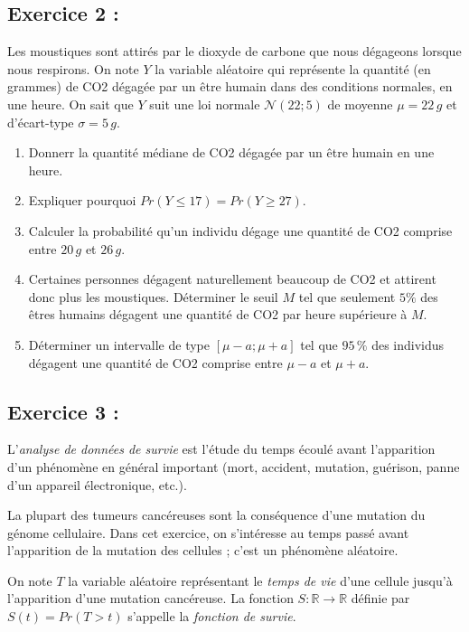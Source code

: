 \documentclass[11pt]{article}
\numberwithin{equation}{section}
\begin{document}
\subsection*{Exercice 2 :} 
Les moustiques sont attirés par le dioxyde de carbone que nous dégageons lorsque nous respirons.
On note $Y$ la variable aléatoire qui représente la quantité (en grammes) de CO2 dégagée par un être 
humain dans des conditions normales, en une heure. 
On sait que $Y$ suit une loi normale $\mathcal{N}(22;5)$ de moyenne $\mu=22 \,g$ et d'écart-type 
$\sigma=5 \,g$. 
\begin{enumerate}
\item Donnerr la quantité médiane de CO2 dégagée par un être humain en une heure.
\item Expliquer pourquoi $Pr(Y\leq 17) = Pr(Y\geq 27)$. 
\item Calculer la probabilité qu'un individu dégage une quantité de CO2 comprise entre
$20\,g$ et  $26\,g$.
\item Certaines personnes dégagent naturellement beaucoup de CO2 et attirent donc plus les moustiques. Déterminer le seuil $M$ tel que seulement $5\%$ des êtres humains dégagent une quantité de CO2 par 
heure supérieure à $M$.
\item Déterminer un intervalle de type $[\mu - a ; \mu + a]$ tel que $95\,\%$ des individus 
dégagent une quantité de CO2 comprise entre $\mu - a$ et $\mu + a$.  \\
\end{enumerate}



\bigskip
\subsection*{Exercice 3 :} 

L'{\it analyse de donn\'ees de survie} est l'\'etude du temps \'ecoul\'e avant l'apparition d'un 
ph\'enom\`ene en g\'en\'eral important (mort, accident, mutation, gu\'erison, panne d'un appareil \'electronique, etc.).

La plupart des tumeurs canc\'ereuses sont la cons\'equence d'une mutation du g\'enome cellulaire. 
Dans cet exercice, on s'int\'eresse au temps pass\'e avant l'apparition de la mutation des cellules ; 
c'est un ph\'enom\`ene al\'eatoire. 

On note $T$ la variable al\'eatoire repr\'esentant le {\it temps de vie} d'une cellule jusqu'\`a 
l'apparition d'une mutation canc\'ereuse. 
La fonction $S : \mathbb{R}\longrightarrow \mathbb{R}$ d\'efinie par $S(t)=Pr(T>t)$ s'appelle la 
{\it fonction de survie}.
\end{document}
